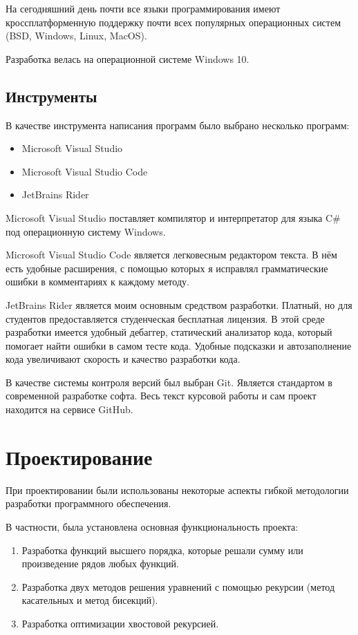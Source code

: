 На сегодняшний день почти все языки программирования имеют кроссплатформенную поддержку почти всех популярных операционных систем (BSD, Windows, Linux, MacOS).

Разработка велась на операционной системе Windows 10.

\subsection{Инструменты}

В качестве инструмента написания программ было выбрано несколько программ:

\begin{itemize}
	\item Microsoft Visual Studio
	\item Microsoft Visual Studio Code
	\item JetBrains Rider
\end{itemize}

Microsoft Visual Studio поставляет компилятор и интерпретатор для языка C\# под операционную систему Windows.

Microsoft Visual Studio Code является легковесным редактором текста.
В нём есть удобные расширения, с помощью которых я исправлял грамматические ошибки в комментариях к каждому методу.

JetBrains Rider является моим основным средством разработки.
Платный, но для студентов предоставляется студенческая бесплатная лицензия.
В этой среде разработки имеется удобный дебаггер, статический анализатор кода, который помогает найти ошибки в самом тесте кода.
Удобные подсказки и автозаполнение кода увеличивают скорость и качество разработки кода.

В качестве системы контроля версий был выбран Git.
Является стандартом в современной разработке софта.
Весь текст курсовой работы и сам проект находится на сервисе GitHub\cite{GitHub}.

\newpage
\section{Проектирование}

При проектировании были использованы некоторые аспекты гибкой методологии разработки программного обеспечения.

В частности, была установлена основная функциональность проекта:

\begin{enumerate}
	\item Разработка функций высшего порядка, которые решали сумму или произведение рядов любых функций.
	\item Разработка двух методов решения уравнений с помощью рекурсии (метод касательных и метод бисекций).
	\item Разработка оптимизации хвостовой рекурсией.
\end{enumerate}

